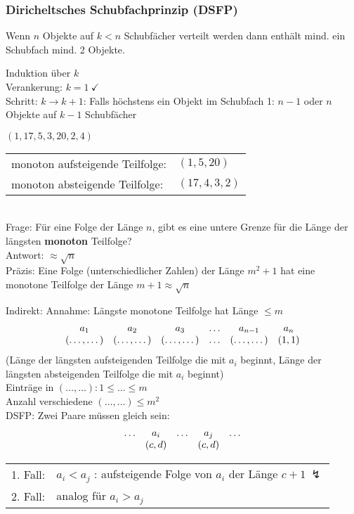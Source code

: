 \subsubsection{Diricheltsches Schubfachprinzip (DSFP)}
\begin{satz*}
	Wenn $n$ Objekte auf $k<n$ Schubfächer verteilt werden dann enthält mind. ein Schubfach mind. 2 Objekte.
	\begin{bew}
		Induktion über $k$ \\
		Verankerung: $k=1 \:\checkmark$ \\
		Schritt: $k \rightarrow k+1$: Falls höchstens ein Objekt im Schubfach 1: $n-1$ oder $n$ Objekte auf $k-1$ Schubfächer 
	\end{bew}
\end{satz*}
\begin{bsp*}
	$(1,17,5,3,20,2,4)$\\
	\begin{tabular}{ l l }
		monoton aufsteigende Teilfolge\index{Teilfolge!monoton aufsteigend}:	&$(1,5,20)$ \\
		monoton absteigende Teilfolge\index{Teilfolge!monoton absteigend}:	&$(17,4,3,2)$
	\end{tabular}\\
	Frage: Für eine Folge der Länge $n$, gibt es  eine untere Grenze für die Länge  der längsten \textbf{monoton} Teilfolge? \\
	Antwort: $\approx \sqrt{n}$\\
	Präzis: Eine Folge (unterschiedlicher Zahlen) der Länge $m^2 + 1$ hat eine monotone Teilfolge der Länge $m+1 \approx \sqrt{n}$
	\begin{bew}
		Indirekt: Annahme: Längste monotone Teilfolge hat Länge $\leq m$\\
		\[
			\begin{array}{ c c c c c c }
				a_1			& a_2				&a_3				& \dots	& a_{n-1}			& a_n		\\
				(\dots , \dots  )	& (\dots , \dots  )	& (\dots , \dots  )	& \dots	& (\dots , \dots  )	& (1,1)
			\end{array}
		\]
		(Länge der längsten aufsteigenden Teilfolge die mit $a_i$ beginnt, Länge der längsten absteigenden Teilfolge die mit $a_i$ beginnt)\\
		Einträge in $(\dots , \dots  ) : 1 \leq \dots \leq m$ \\
		Anzahl verschiedene $(\dots , \dots  ) \leq m^2$ \\
		DSFP: Zwei Paare müssen gleich sein: \\
		\[\begin{array}{ c c c c c }
			\dots		& a_i		& \dots	& a_j 		& \dots 	\\
					& (c,d)	&		& (c,d)	&		
		\end{array}\]
		\begin{tabular}{ l l }
			1. Fall:	& $a_i < a_j$ : aufsteigende Folge von $a_i$ der Länge $c+1 \:\lightning$ \\
			2. Fall:	& analog für $a_i > a_j$
		\end{tabular}
	\end{bew}
\end{bsp*}

